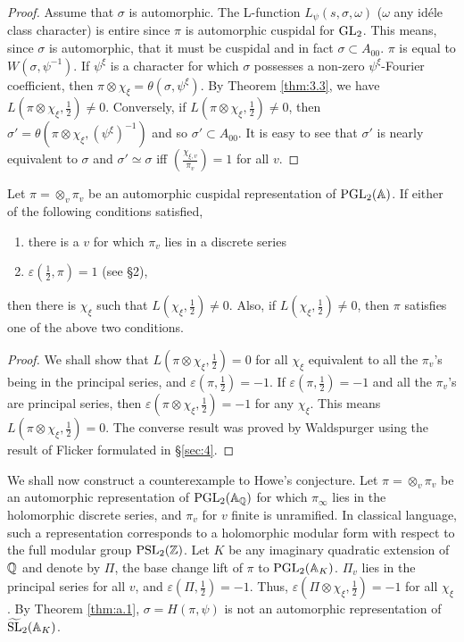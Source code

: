 \begin{appendices}
\begin{proof}
Assume that $\sigma$ is automorphic.
The L-function $L_\psi(s, \sigma,\omega)$ ($\omega$ any id\'ele class character) is entire since $\pi$ is automorphic cuspidal for $\mathrm{GL}_2$.
This means, since $\sigma$ is automorphic, that it must be cuspidal and in fact $\sigma \subset A_{00}$.
$\pi$ is equal to $W(\sigma, \psi^{-1})$.
If $\psi^\xi$ is a character for which $\sigma$ possesses a non-zero $\psi^\xi$-Fourier coefficient, then $\pi \otimes \chi_\xi = \theta(\sigma, \psi^\xi)$.
By Theorem \ref{thm:3.3}, we have $L(\pi \otimes \chi_\xi, \frac{1}{2}) \neq 0$.
Conversely, if $L(\pi \otimes \chi_\xi, \frac{1}{2}) \neq 0$, then $\sigma' = \theta(\pi \otimes \chi_\xi, (\psi^\xi)^{-1})$ and so $\sigma' \subset A_{00}$.
It is easy to see that $\sigma'$ is nearly equivalent to $\sigma$ and $\sigma' \simeq \sigma$ iff $\left(\frac{\chi_{\xi, v}}{\pi_v}\right) = 1$ for all $v$.
\end{proof}

\begin{theorem}
\label{thm:a.2}
Let $\pi = \otimes_v \pi_v$ be an automorphic cuspidal representation of $\mathrm{PGL}_2(\mathbb{A})$.
If either of the following conditions satisfied,
\begin{enumerate}[label=(\roman*)]
    \item there is a $v$ for which $\pi_v$ lies in a discrete series
    \item $\varepsilon(\frac{1}{2}, \pi) = 1$ (see \S 2),
\end{enumerate}
then there is $\chi_\xi$ such that $L(\chi_\xi, \frac{1}{2}) \neq 0$.
Also, if $L(\chi_\xi, \frac{1}{2}) \neq 0$, then $\pi$ satisfies one of the above two conditions.
\end{theorem}
\begin{proof}
We shall show that $L( \pi \otimes \chi_\xi,\frac{1}{2}) = 0$ for all $\chi_\xi$ equivalent to all the $\pi_v$'s being in the principal series, and $\varepsilon(\pi, \frac{1}{2}) = -1$.
If $\varepsilon(\pi, \frac{1}{2}) = -1$ and all the $\pi_v$'s are principal series, then $\varepsilon(\pi \otimes \chi_\xi, \frac{1}{2}) = -1$ for any $\chi_\xi$.
This means $L(\pi \otimes \chi_\xi, \frac{1}{2}) = 0$.
The converse result was proved by Waldspurger using the result of Flicker \cite{flicker80covering} formulated in \S \ref{sec:4}.
\end{proof}

We shall now construct a counterexample to Howe's conjecture.
Let $\pi = \otimes_v \pi_v$ be an automorphic representation of $\mathrm{PGL}_2(\mathbb{A}_{\mathbb{Q}})$ for which $\pi_\infty$ lies in the holomorphic discrete series, and $\pi_v$ for $v$ finite is unramified.
In classical language, such a representation corresponds to a holomorphic modular form with respect to the full modular group $\mathrm{PSL}_2(\mathbb{Z})$.
Let $K$ be any imaginary quadratic extension of $\mathbb{Q}$ and denote by $\Pi$, the base change lift of $\pi$ to $\mathrm{PGL}_2(\mathbb{A}_K)$.
$\Pi_v$ lies in the principal series for all $v$, and $\varepsilon(\Pi, \frac{1}{2}) = -1$.
Thus, $\varepsilon(\Pi \otimes \chi_\xi, \frac{1}{2}) =-1$ for all $\chi_\xi$.
By Theorem \ref{thm:a.1}, $\sigma = H(\pi, \psi)$ is not an automorphic representation of $\widetilde{\mathrm{SL}}_2(\mathbb{A}_K)$.



\end{appendices}
